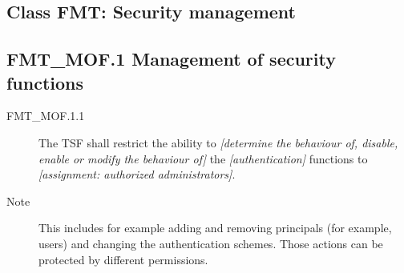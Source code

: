 \documentclass[10pt,a4paper,english]{book}
\begin{document}
\hypertarget{class-fmt-security-management}{}
\subsection{Class FMT: Security management}



\hypertarget{fmt-mof-1-management-of-security-functions}{}
\subsection{FMT{\_}MOF.1 Management of security functions}
\begin{description}
\item[FMT{\_}MOF.1.1]

The TSF shall restrict the ability to \emph{{[}determine the
behaviour of, disable, enable or modify the behaviour of]} the
\emph{{[}authentication]} functions to \emph{{[}assignment: 
authorized administrators]}.

\item[Note]

This includes for example adding and removing principals (for example,
users) and changing the authentication schemes. Those actions can be
protected by different permissions.

\end{description}



\hypertarget{fmt-msa-1-management-of-security-attributes}{}
\end{document}

